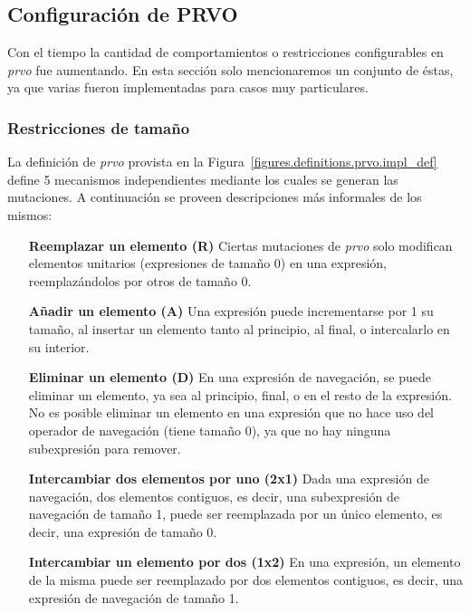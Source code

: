 \subsection{Configuraci\'on de PRVO}

Con el tiempo la cantidad de comportamientos o restricciones configurables en \emph{prvo} fue aumentando. En esta secci\'on solo mencionaremos un conjunto de \'estas, ya que varias fueron implementadas para casos muy particulares.

\subsubsection{Restricciones de tama\~no}
\label{sec:implementation.prvo.restrictions.size}

La definici\'on de \emph{prvo} provista en la Figura~\ref{figures.definitions.prvo.impl_def} define 5 mecanismos independientes mediante los cuales se generan las mutaciones. A continuaci\'on se proveen descripciones m\'as informales de los mismos:

\begin{enumerate}[leftmargin=.75cm,align=left]
	\item[\textbf{Reemplazar un elemento (R)}] Ciertas mutaciones de \emph{prvo} solo modifican elementos unitarios (expresiones de tama\~no 0) en una expresi\'on, reemplaz\'andolos por otros de tama\~no 0.
	
	\item[\textbf{A\~nadir un elemento (A)}] Una expresi\'on puede incrementarse por 1 su tama\~no, al insertar un elemento tanto al principio, al final, o intercalarlo en su interior.
	
	\item[\textbf{Eliminar un elemento (D)}] En una expresi\'on de navegaci\'on, se puede eliminar un elemento, ya sea al principio, final, o en el resto de la expresi\'on. No es posible eliminar un elemento en una expresi\'on que no hace uso del operador de navegaci\'on (tiene tama\~no 0), ya que no hay ninguna subexpresi\'on para remover.
	
	\item[\textbf{Intercambiar dos elementos por uno (2x1)}] Dada una expresi\'on de navegaci\'on, dos elementos contiguos, es decir, una subexpresi\'on de navegaci\'on de tama\~no 1, puede ser reemplazada por un \'unico elemento, es decir, una expresi\'on de tama\~no 0.
	
	\item[\textbf{Intercambiar un elemento por dos (1x2)}] En una expresi\'on, un elemento de la misma puede ser reemplazado por dos elementos contiguos, es decir, una expresi\'on de navegaci\'on de tama\~no 1.
\end{enumerate}

